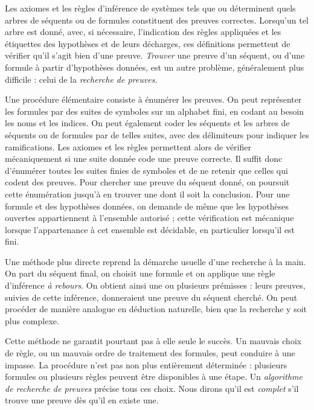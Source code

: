 \documentclass[../../../include/open-logic-section]{subfiles}
\begin{document}


Les axiomes et les règles d'inférence de systèmes tels que
 ou  déterminent quels arbres de séquents ou
de formules constituent des preuves correctes. Lorsqu'un tel
arbre est donné, avec, si nécessaire, l'indication des règles
appliquées et les étiquettes des hypothèses et de leurs décharges,
ces définitions permettent de vérifier qu'il s'agit bien d'une
preuve. \emph{Trouver} une preuve d'un séquent, ou d'une formule
à partir d'hypothèses données, est un autre problème, généralement
plus difficile : celui de la \emph{recherche de preuves}.

Une procédure élémentaire consiste à énumérer les preuves.
On peut représenter les formules par des suites de symboles
sur un alphabet fini, en codant au besoin les noms et les indices.
On peut également coder les séquents et les arbres de séquents
ou de formules par de telles suites, avec des délimiteurs
pour indiquer les ramifications. Les axiomes et les règles
permettent alors de vérifier mécaniquement si une suite donnée
code une preuve correcte. Il suffit donc d'énumérer toutes
les suites finies de symboles et de ne retenir que celles
qui codent des preuves. Pour chercher une preuve du séquent
donné, on poursuit cette énumération jusqu'à en trouver une
dont il soit la conclusion. Pour une formule et des hypothèses
données, on demande de même que les hypothèses ouvertes
appartiennent à l'ensemble autorisé ; cette vérification est
mécanique lorsque l'appartenance à cet ensemble est décidable,
en particulier lorsqu'il est fini.

Une méthode plus directe reprend la démarche usuelle d'une
recherche à la main. On part du séquent final, on choisit une
formule et on applique une règle d'inférence \emph{à rebours}.
On obtient ainsi une ou plusieurs prémisses : leurs preuves,
suivies de cette inférence, donneraient une preuve du séquent
cherché. On peut procéder de manière analogue en déduction
naturelle, bien que la recherche y soit plus complexe.

Cette méthode ne garantit pourtant pas à elle seule le succès.
Un mauvais choix de règle, ou un mauvais ordre de traitement
des formules, peut conduire à une impasse. La procédure n'est
pas non plus entièrement déterminée : plusieurs formules
ou plusieurs règles peuvent être disponibles à une étape.
Un \emph{algorithme de recherche de preuves} précise tous ces
choix. Nous dirons qu'il est \emph{complet} s'il trouve une
preuve dès qu'il en existe une.
\end{document}
